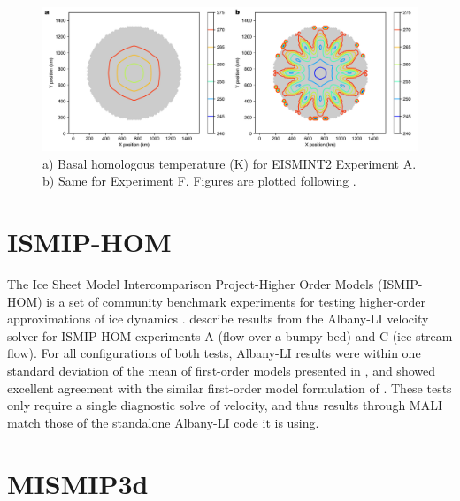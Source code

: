\begin{figure}[t]
\includegraphics[width=16.0cm]{landice/figures/eismint_basal_temps.pdf}
\caption{a) Basal homologous temperature (K) for EISMINT2 Experiment A. b) Same for Experiment F.
Figures are plotted following \citet{payne2000}.
}
\label{eismint-spokes}
\end{figure}


\section{ISMIP-HOM}

The Ice Sheet Model Intercomparison Project-Higher Order Models (ISMIP-HOM)
is a set of community benchmark experiments for testing higher-order approximations of ice dynamics \citep{pattyn2008}.
\citet{tezaur2015a} describe results from the Albany-LI velocity solver for ISMIP-HOM 
experiments A (flow over a bumpy bed) and C (ice stream flow).
For all configurations of both tests, Albany-LI results were within one standard deviation of the mean
of first-order models presented in \citet{pattyn2008}, 
and showed excellent agreement with the similar first-order model formulation of \citet{perego2012}.
These tests only require a single diagnostic solve of velocity,
and thus results through MALI match those of the standalone Albany-LI code it is using.

\section{MISMIP3d}

